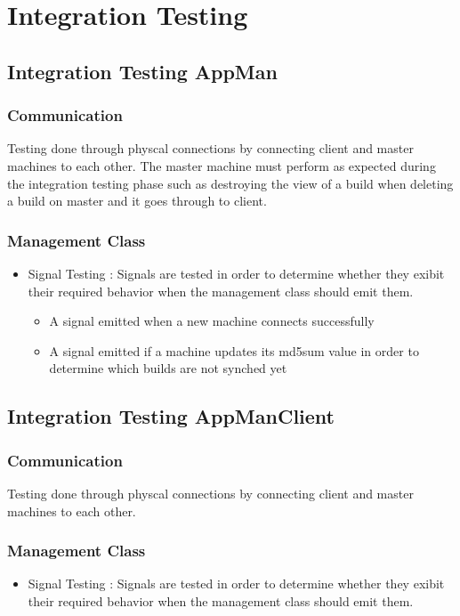 \documentclass[a4paper,12pt,final]{article}
\begin{document}
\section{Integration Testing}

\subsection{Integration Testing AppMan}
\subsubsection{Communication}
Testing done through physcal connections by connecting client and master machines to each other. The master machine must perform as expected during the integration testing phase such as destroying the view of a build when deleting a build on master and it goes through to client.
\subsubsection{Management Class}
\begin{itemize}
\item Signal Testing : Signals are tested in order to determine whether they exibit their required behavior when the management class should emit them.
\begin{itemize}
\item A signal emitted when a new machine connects successfully
\item A signal emitted if a machine updates its md5sum value in order to determine which builds are not synched yet
\end{itemize}
\end{itemize}







\subsection{Integration Testing AppManClient}

\subsubsection{Communication}
Testing done through physcal connections by connecting client and master machines to each other.
\subsubsection{Management Class}
\begin{itemize}
\item Signal Testing : Signals are tested in order to determine whether they exibit their required behavior when the management class should emit them.
\end{itemize}
\end{document}
